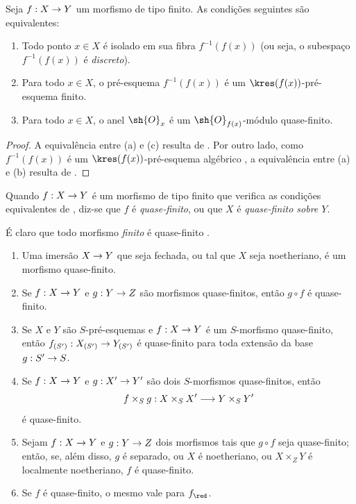 \documentclass[oneside,10pt]{amsart}
\makeatletter
\newcommand{\ega@arrow}[2]{\mathchoice{#1}{#2}{#2}{#2}}
\renewcommand{\to}{\ega@arrow{\longrightarrow}{\rightarrow}}
\let\EGAOriginalLabel\label
\renewcommand{\label}[1]{\phantomsection\EGAOriginalLabel{#1}}
\makeatother
\begin{document}
\begin{corollary}[6.2.2]
\label{II.6.2.2}
Seja $f:X\to Y$ um morfismo de tipo finito.
As condições seguintes são equivalentes:
\begin{enumerate}
  \item[\rm{(a)}] Todo ponto $x\in X$ é isolado em sua fibra $f^{-1}(f(x))$ (ou seja, o subespaço $f^{-1}(f(x))$ é \emph{discreto}).
  \item[\rm{(b)}] Para todo $x\in X$, o pré-esquema $f^{-1}(f(x))$ é um $\kres(f(x))$-pré-esquema finito.
  \item[\rm{(c)}] Para todo $x\in X$, o anel $\sh{O}_x$ é um $\sh{O}_{f(x)}$-módulo quase-finito.
\end{enumerate}
\end{corollary}

\begin{proof}
A equivalência entre (a) e (c) resulta de .
Por outro lado, como $f^{-1}(f(x))$ é um $\kres(f(x))$-pré-esquema algébrico , a equivalência entre (a) e (b) resulta de .
\end{proof}

\begin{definition}[6.2.3]
\label{II.6.2.3}
Quando $f:X\to Y$ é um morfismo de tipo finito que verifica as condições equivalentes de , diz-se que $f$ é \emph{quase-finito}, ou que $X$ é \emph{quase-finito sobre $Y$}.
\end{definition}

É claro que todo morfismo \emph{finito} é quase-finito .

\begin{proposition}[6.2.4]
\label{II.6.2.4}
\medskip\noindent
\begin{enumerate}
  \item[\rm{(i)}] Uma imersão $X\to Y$ que seja fechada, ou tal que $X$ seja noetheriano, é um morfismo quase-finito.
  \item[\rm{(ii)}] Se $f:X\to Y$ e $g:Y\to Z$ são morfismos quase-finitos, então $g\circ f$ é quase-finito.
  \item[\rm{(iii)}] Se $X$ e $Y$ são $S$-pré-esquemas e $f:X\to Y$ é um $S$-morfismo quase-finito, então $f_{(S')}:X_{(S')}\to Y_{(S')}$ é quase-finito para toda extensão da base $g:S'\to S$.
  \item[\rm{(iv)}] Se $f:X\to Y$ e $g:X'\to Y'$ são dois $S$-morfismos quase-finitos, então
    \[
      f\times_S g:X\times_S X'\to Y\times_S Y'
    \]
    é quase-finito.
  \item[\rm{(v)}] Sejam $f:X\to Y$ e $g:Y\to Z$ dois morfismos tais que $g\circ f$ seja quase-finito; então, se, além disso, $g$ é separado, ou $X$ é noetheriano, ou $X\times_ZY$ é localmente noetheriano, $f$ é quase-finito.
  \item[\rm{(vi)}] Se $f$ é quase-finito, o mesmo vale para $f_\red$.
\end{enumerate}
\end{proposition}
\end{document}
